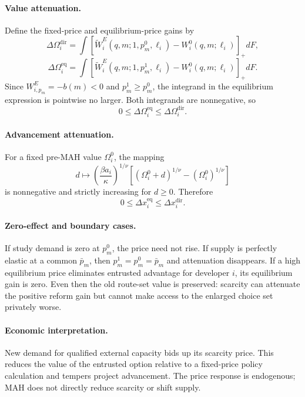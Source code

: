 \paragraph{Value attenuation.}
Define the fixed-price and equilibrium-price gains by
\[
  \Delta\Omega_i^{\mathrm{dir}}
  =
  \int
  [\widetilde W_i^E(q,m;1,p_m^0,\ell_i)
   -W_i^0(q,m;\ell_i)]_+
  dF,
\]
\[
  \Delta\Omega_i^{\mathrm{eq}}
  =
  \int
  [\widetilde W_i^E(q,m;1,p_m^1,\ell_i)
   -W_i^0(q,m;\ell_i)]_+
  dF.
\]
Since \(W_{i,p_m}^E=-b(m)<0\) and
\(p_m^1\geq p_m^0\), the integrand in the equilibrium expression is
pointwise no larger. Both integrands are nonnegative, so
\begin{equation}
  0
  \leq
  \Delta\Omega_i^{\mathrm{eq}}
  \leq
  \Delta\Omega_i^{\mathrm{dir}}.
  \label{eq:p08-scarcity-value-bounds}
\end{equation}

\paragraph{Advancement attenuation.}
For a fixed pre-MAH value \(\Omega_i^0\), the mapping
\[
  d\longmapsto
  \left(\frac{\beta a_i}{\kappa}\right)^{1/\nu}
  [(\Omega_i^0+d)^{1/\nu}-(\Omega_i^0)^{1/\nu}]
\]
is nonnegative and strictly increasing for \(d\geq0\). Therefore
\begin{equation}
  0
  \leq
  \Delta x_i^{\mathrm{eq}}
  \leq
  \Delta x_i^{\mathrm{dir}}.
  \label{eq:p08-scarcity-advancement-bounds}
\end{equation}

\paragraph{Zero-effect and boundary cases.}
If study demand is zero at \(p_m^0\), the price need not rise. If supply is
perfectly elastic at a common \(\bar p_m\), then
\(p_m^1=p_m^0=\bar p_m\) and attenuation disappears. If a high equilibrium
price eliminates entrusted advantage for developer \(i\), its equilibrium
gain is zero. Even then the old route-set value is preserved: scarcity can
attenuate the positive reform gain but cannot make access to the enlarged
choice set privately worse.

\paragraph{Economic interpretation.}
New demand for qualified external capacity bids up its scarcity price. This
reduces the value of the entrusted option relative to a fixed-price policy
calculation and tempers project advancement. The price response is endogenous;
MAH does not directly reduce scarcity or shift supply.


